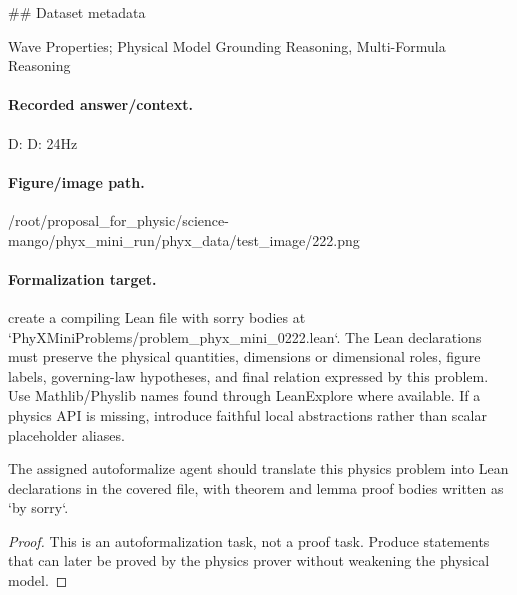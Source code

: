 \#\# Dataset metadata

Wave Properties; Physical Model Grounding Reasoning, Multi-Formula Reasoning

\paragraph{Recorded answer/context.}
D: D: 24Hz

\paragraph{Figure/image path.}
/root/proposal\_for\_physic/science-mango/phyx\_mini\_run/phyx\_data/test\_image/222.png

\paragraph{Formalization target.}
create a compiling Lean file with sorry bodies at `PhyXMiniProblems/problem\_phyx\_mini\_0222.lean`. The Lean declarations must preserve the physical quantities, dimensions or dimensional roles, figure labels, governing-law hypotheses, and final relation expressed by this problem.
Use Mathlib/Physlib names found through LeanExplore where available. If a physics API is missing, introduce faithful local abstractions rather than scalar placeholder aliases.

\begin{theorem}
\label{thm:physics:phyx_mini_0222:target}
The assigned autoformalize agent should translate this physics problem into Lean declarations in the covered file, with theorem and lemma proof bodies written as `by sorry`.
\end{theorem}
\begin{proof}
This is an autoformalization task, not a proof task. Produce statements that can later be proved by the physics prover without weakening the physical model.
\end{proof}

